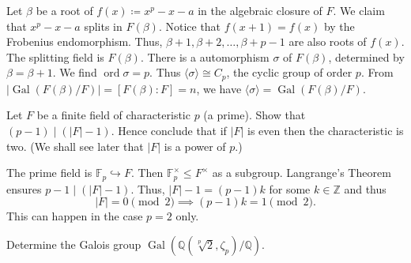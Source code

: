 \begin{solution}
    Let $\beta$ be a root of $f(x)\coloneqq  x^p-x-a$ in the algebraic closure of $F$. We claim that $x^p-x-a$ splits in $F(\beta)$. 
    Notice that $f(x+1)=f(x)$ by the Frobenius endomorphism. Thus, $\beta+1, \beta+2,\dots,\beta+p-1$ are also roots of $f(x)$. 
    The splitting field is $F(\beta)$. There is a automorphism $\sigma$ of $F(\beta)$, determined by $\beta=\beta+1$. 
    We find $\operatorname{ord}\sigma=p$. Thus $\langle \sigma \rangle\cong C_{p}$, the cyclic group of order $p$. 
    From $|\operatorname{Gal}(F(\beta)/F)|=[F(\beta):F]=n$, we have $\langle \sigma \rangle=\operatorname{Gal}(F(\beta)/F)$.
\end{solution}

\setcounter{pb}{21}
\begin{problem}
Let $F$ be a finite field of characteristic $p$ (a prime). Show that $(p - 1) \mid (|F| - 1)$. Hence conclude that if $|F|$ is even then the characteristic is two. (We shall see later that $|F|$ is a power of $p$.)
\end{problem}

\begin{solution}
    The prime field is $\mathbb{F}_{p}\hookrightarrow F$. Then $\mathbb{F}_{p}^{\times}\leq F^{\times}$ as a subgroup. Langrange's Theorem ensures $p-1\mid(|F|-1)$. 
    Thus, $|F|-1=(p-1)k$ for some $k\in\mathbb{Z}$ and thus 
        \[
            |F|=0\pmod 2\implies (p-1)k=1\pmod2.
        \]
    This can happen in the case $p=2$ only.
\end{solution}


    

\setcounter{pb}{26}
\begin{problem}
    Determine the Galois group $ \operatorname{Gal}(\mathbb{Q}(\sqrt[p]{2}, \zeta_p)/\mathbb{Q}) $.
\end{problem}

